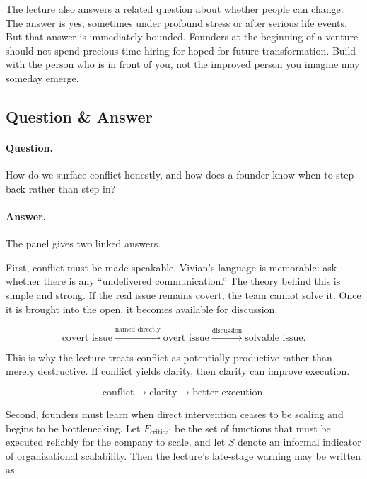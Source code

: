 The lecture also answers a related question about whether people can change. The answer is yes, sometimes under profound stress or after serious life events. But that answer is immediately bounded. Founders at the beginning of a venture should not spend precious time hiring for hoped-for future transformation. Build with the person who is in front of you, not the improved person you imagine may someday emerge.

\subsection{Question \& Answer}

\paragraph{Question.} How do we surface conflict honestly, and how does a founder know when to step back rather than step in?

\paragraph{Answer.} The panel gives two linked answers.

First, conflict must be made speakable. Vivian's language is memorable: ask whether there is any ``undelivered communication.'' The theory behind this is simple and strong. If the real issue remains covert, the team cannot solve it. Once it is brought into the open, it becomes available for discussion.

\begin{equation}
\text{covert issue}
\xrightarrow{\text{named directly}}
\text{overt issue}
\xrightarrow{\text{discussion}}
\text{solvable issue}.
\end{equation}

This is why the lecture treats conflict as potentially productive rather than merely destructive. If conflict yields clarity, then clarity can improve execution.

\begin{equation}
\text{conflict} \rightarrow \text{clarity} \rightarrow \text{better execution}.
\end{equation}

Second, founders must learn when direct intervention ceases to be scaling and begins to be bottlenecking. Let \(F_{\mathrm{critical}}\) be the set of functions that must be executed reliably for the company to scale, and let \(S\) denote an informal indicator of organizational scalability. Then the lecture's late-stage warning may be written as

